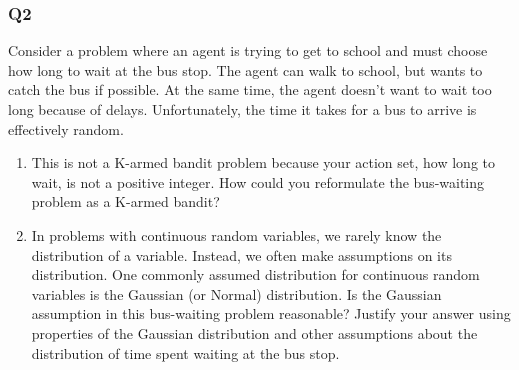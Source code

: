 \documentclass[a4paper, 10pt]{article}
\begin{document}
\subsubsection*{Q2}
Consider a problem where an agent is trying to get to school and must choose how long to wait at the bus stop. The agent can walk to school, but wants to catch the bus if possible. At the same time, the agent doesn't want to wait too long because of delays. Unfortunately, the time it takes for a bus to arrive is effectively random.

\begin{enumerate}
\item This is not a K-armed bandit problem because your action set, how long to wait, is not a positive integer. How could you reformulate the bus-waiting problem as a K-armed bandit?
\item In problems with continuous random variables, we rarely know the distribution of a variable. Instead, we often make assumptions on its distribution. One commonly assumed distribution for continuous random variables is the Gaussian (or Normal) distribution. Is the Gaussian assumption in this bus-waiting problem reasonable? Justify your answer using properties of the Gaussian distribution and other assumptions about the distribution of time spent waiting at the bus stop.
\end{enumerate}
\end{document}
